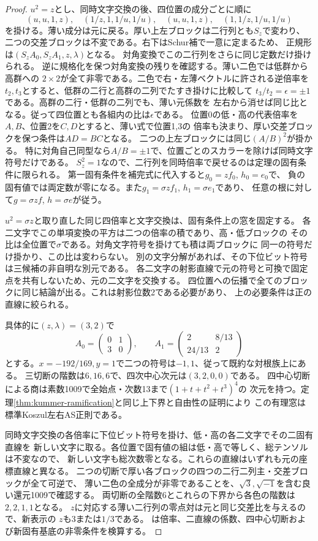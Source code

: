 \begin{proof}
$u^2=z$とし、同時文字交換の後、四位置の成分ごとに順に
\[
 (u,u,1,z),\quad(1/z,1,1/u,1/u),\quad
 (u,u,1,z),\quad(1,1/z,1/u,1/u)
\]
を掛ける。薄い成分は元に戻る。厚い上左ブロックは二行列とも$S_z$で変わり、
二つの交差ブロックは不変である。右下はSchur補で一意に定まるため、
正規形は$(S_zA_0,S_zA_1,z,\lambda)$となる。
対角変換でこの二行列をさらに同じ定数だけ掛けられる。
逆に規格化を保つ対角変換の残りを確認する。薄い二色では低群から高群への
$2\times2$が全て非零である。二色で右・左薄ベクトルに許される逆倍率を
$t_2,t_3$とすると、低群の二行と高群の二列でたすき掛けに比較して
$t_3/t_2=\epsilon=\pm1$である。高群の二行・低群の二列でも、薄い元係数を
左右から消せば同じ比となる。従って四位置とも各組内の比は$\epsilon$である。
位置0の低・高の代表倍率を$A,B$、位置2を$C,D$とすると、薄い式で位置1,3の
倍率も決まり、厚い交差ブロックを保つ条件は$AD=BC$となる。
二つの上左ブロックには同じ$(A/B)^2$が掛かる。
特に対角自己同型なら$A/B=\pm1$で、位置ごとのスカラーを除けば同時文字符号だけである。
$S_z^2=1$なので、二行列を同時倍率で戻せるのは定理の固有条件に限られる。
第一固有条件を補完式に代入すると$g_0=zf_0$, $h_0=e_0$で、
負の固有値では両定数が零になる。また$g_1=\sigma z f_1$, $h_1=\sigma e_1$であり、
任意の根に対して$g=\sigma zf$, $h=\sigma e$が従う。

$u^2=\sigma z$と取り直した同じ四倍率と文字交換は、固有条件上の窓を固定する。
各二文字でこの単項変換の平方は二つの倍率の積であり、高・低ブロックの
その比は全位置で$\sigma$である。対角文字符号を掛けても積は両ブロックに
同一の符号だけ掛かり、この比は変わらない。
別の文字分解があれば、その下位ビット符号は三候補の非自明な別元である。
各二文字の射影直線で元の符号と可換で固定点を共有しないため、元の二文字を交換する。
四位置への伝播で全てのブロックに同じ結論が出る。これは射影位数2である必要があり、
上の必要条件は正の直線に絞られる。

具体的に$(z,\lambda)=(3,2)$で
\[
 A_0=\begin{pmatrix}0&1\\3&0\end{pmatrix},\qquad
 A_1=\begin{pmatrix}2&8/13\\24/13&2\end{pmatrix}
\]
とする。$x=-192/169,y=1$で二つの符号は$-1,1$、従って既約な対根族上にある。
三切断の階数は$6,16,6$で、四次中心次元は$(3,2,0,0)$である。
四中心切断による商は素数1009で全始点・次数13まで$(1+t+t^2+t^3)^4$の
次元を持つ。定理\ref{thm:kummer-ramification}と同じ上下界と自由性の証明により
この有理窓は標準Koszul左右AS正則である。

同時文字交換の各倍率に下位ビット符号を掛け、低・高の各二文字でその二固有直線を
新しい文字に取る。各位置で固有値の組は低・高で等しく、総テンソルは不変なので、
新しい文字も総次数零となる。これらの直線はいずれも元の座標直線と異なる。
二つの切断で厚い各ブロックの四つの二行二列主・交差ブロックが全て可逆で、
薄い二色の全成分が非零であることを、$\sqrt3,\sqrt{-1}$を含む良い還元1009で確認する。
両切断の全階数6とこれらの下界から各色の階数は$2,2,1,1$となる。
$z$に対応する薄い二行列の零点対は元と同じ交差比を与えるので、新表示の
$z$も$3$または$1/3$である。
は倍率、二直線の係数、四中心切断および新固有基底の非零条件を検算する。
\end{proof}
